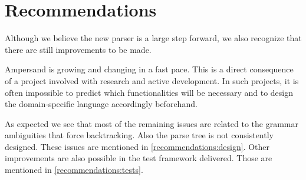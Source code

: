 
\section{Recommendations}
\label{sec:recommendations}
Although we believe the new parser is a large step forward, we also recognize that there are still improvements to be made.

Ampersand is growing and changing in a fast pace.
This is a direct consequence of a project involved with research and active development.
In such projects, it is often impossible to predict which functionalities will be necessary and to design the domain-specific language accordingly beforehand.

As expected we see that most of the remaining issues are related to the grammar ambiguities that force backtracking.
Also the parse tree is not consistently designed.
These issues are mentioned in \autoref{recommendations:design}.
Other improvements are also possible in the test framework delivered.
Those are mentioned in \autoref{recommendations:tests}.






